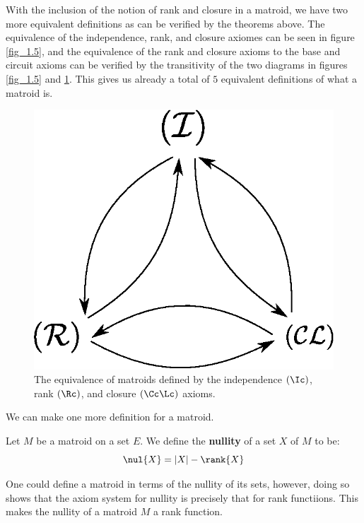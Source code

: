 With the inclusion of the notion of rank and closure in a matroid, we have two
more equivalent definitions as can be verified by the theorems above. The
equivalence of the independence, rank, and closure axiomes can be seen in
figure \ref{fig_1.5}, and the equivalence of the rank and closure axioms to the
base and circuit axioms can be verified by the transitivity of the two diagrams
in figures \ref{fig_1.5} and \ref{fig_1.8}. This gives us already a total of $5$
equivalent definitions of what a matroid is.

\begin{figure}[h]
    \centering
    \includegraphics[scale=0.5]{Figures/Chapter1/equiv_def_2.eps}
    \caption{The equivalence of matroids defined by the independence $(\Ic)$,
    rank $(\Rc)$, and closure $(\Cc\Lc)$ axioms.}
    \label{fig_1.8}
\end{figure}

We can make one more definition for a matroid.

\begin{definition}
    Let $M$ be a matroid on a set  $E$. We define the  \textbf{nullity} of a set
    $X$ of  $M$ to be:
    \begin{equation*}
        \nul{X}=|X|-\rank{X}
    \end{equation*}
\end{definition}

One could define a matroid in terms of the nullity of its sets, however, doing
so shows that the axiom system for nullity is precisely that for rank
functiions. This makes the nullity of a matroid $M$ a rank function.
